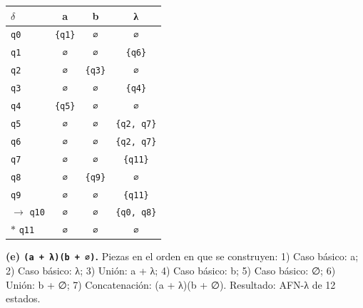 \documentclass[11pt]{article}
\begin{document}
\begin{center}\small\begin{tabular}{lccc}\toprule
$\delta$ & a & b & λ \\\midrule
 \texttt{q0} & \texttt{\{q1\}} & \texttt{∅} & \texttt{∅} \\
 \texttt{q1} & \texttt{∅} & \texttt{∅} & \texttt{\{q6\}} \\
 \texttt{q2} & \texttt{∅} & \texttt{\{q3\}} & \texttt{∅} \\
 \texttt{q3} & \texttt{∅} & \texttt{∅} & \texttt{\{q4\}} \\
 \texttt{q4} & \texttt{\{q5\}} & \texttt{∅} & \texttt{∅} \\
 \texttt{q5} & \texttt{∅} & \texttt{∅} & \texttt{\{q2, q7\}} \\
 \texttt{q6} & \texttt{∅} & \texttt{∅} & \texttt{\{q2, q7\}} \\
 \texttt{q7} & \texttt{∅} & \texttt{∅} & \texttt{\{q11\}} \\
 \texttt{q8} & \texttt{∅} & \texttt{\{q9\}} & \texttt{∅} \\
 \texttt{q9} & \texttt{∅} & \texttt{∅} & \texttt{\{q11\}} \\
$\to$ \texttt{q10} & \texttt{∅} & \texttt{∅} & \texttt{\{q0, q8\}} \\
$*$ \texttt{q11} & \texttt{∅} & \texttt{∅} & \texttt{∅} \\
\bottomrule\end{tabular}\end{center}
\textbf{(e) \texttt{(a + λ)(b + ∅)}.} Piezas en el orden en que se construyen: 1) Caso básico: a; 2) Caso básico: λ; 3) Unión: a + λ; 4) Caso básico: b; 5) Caso básico: ∅; 6) Unión: b + ∅; 7) Concatenación: (a + λ)(b + ∅). Resultado: AFN-λ de 12 estados.
\end{document}
